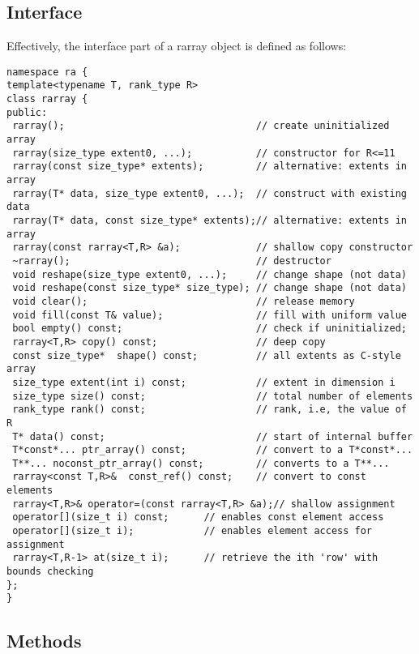\documentclass[11pt,twoside]{article}
\begin{document}
\subsection{Interface}
Effectively, the interface part of a rarray object is defined as follows:%
\vspace{-8pt}%
\begin{framed}\vspace{-14pt}%
\begin{verbatim}
namespace ra {
template<typename T, rank_type R>
class rarray {
public:    
 rarray();                                 // create uninitialized array
 rarray(size_type extent0, ...);           // constructor for R<=11
 rarray(const size_type* extents);         // alternative: extents in array
 rarray(T* data, size_type extent0, ...);  // construct with existing data
 rarray(T* data, const size_type* extents);// alternative: extents in array
 rarray(const rarray<T,R> &a);             // shallow copy constructor   
 ~rarray();                                // destructor 
 void reshape(size_type extent0, ...);     // change shape (not data)
 void reshape(const size_type* size_type); // change shape (not data)
 void clear();                             // release memory
 void fill(const T& value);                // fill with uniform value
 bool empty() const;                       // check if uninitialized;
 rarray<T,R> copy() const;                 // deep copy
 const size_type*  shape() const;          // all extents as C-style array
 size_type extent(int i) const;            // extent in dimension i
 size_type size() const;                   // total number of elements
 rank_type rank() const;                   // rank, i.e, the value of R
 T* data() const;                          // start of internal buffer
 T*const*... ptr_array() const;            // convert to a T*const*... 
 T**... noconst_ptr_array() const;         // converts to a T**... 
 rarray<const T,R>&  const_ref() const;    // convert to const elements
 rarray<T,R>& operator=(const rarray<T,R> &a);// shallow assignment
 operator[](size_t i) const;      // enables const element access
 operator[](size_t i);            // enables element access for assignment
 rarray<T,R-1> at(size_t i);      // retrieve the ith 'row' with bounds checking
};
}
\end{verbatim}
\end{framed}



\subsection{Methods}
\end{document}
